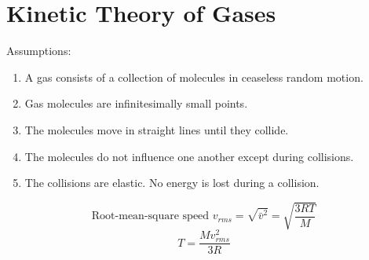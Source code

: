 \documentclass[10pt]{article}
\begin{document}
\pagebreak
\section*{Kinetic Theory of Gases}
Assumptions: 
\begin{enumerate}
    \item A gas consists of a collection of molecules in ceaseless random motion.
    \item Gas molecules are infinitesimally small points.
    \item The molecules move in straight lines until they collide.
    \item The molecules do not influence one another except during collisions.
    \item The collisions are elastic.  No energy is lost during a collision.
\end{enumerate}
\[\text{Root-mean-square speed }v_{rms} = \sqrt{\bar v^2} = \sqrt{\frac{3RT}{M}}\]
\[T = \frac{Mv^2_{rms}}{3R}\]
\end{document}
